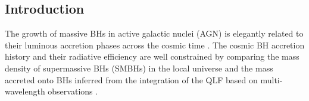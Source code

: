 \documentclass[twocolumn, twocolappendix]{aastex63}
\begin{document}
\begin{CJK*}{UTF8}{gbsn}



\vspace{5mm}
\section{Introduction} \label{sec:intro}
The growth of massive BHs in active galactic nuclei (AGN) is elegantly related to their luminous accretion phases
across the cosmic time \citep{1982MNRAS.200..115S}.
The cosmic BH accretion history and their radiative efficiency are well constrained by 
comparing the mass density of supermassive BHs (SMBHs) in the local universe and the mass accreted onto BHs inferred from
the integration of the QLF based on multi-wavelength observations
\citep[e.g.][]{1971ApJ...170..223C,1992MNRAS.259..725S,2002MNRAS.335..965Y,2004MNRAS.351..169M,2008MNRAS.388.1011M,2004MNRAS.354.1020S,
2009ApJ...690...20S,2014MNRAS.439.2736D,2014ApJ...786..104U,2017A&A...600A..64T,2022arXiv220607357S}.



\end{CJK*}
\end{document}

